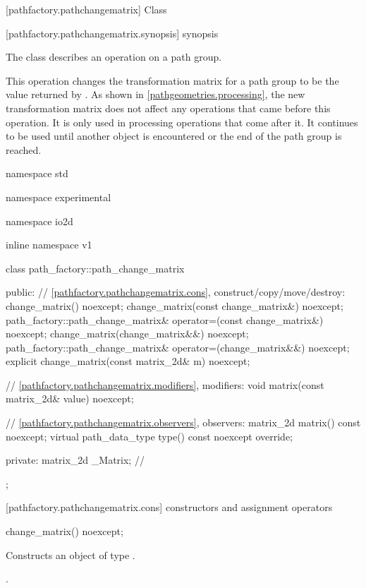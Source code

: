  [pathfactory.pathchangematrix] {Class }

 [pathfactory.pathchangematrix.synopsis] { synopsis}

\pnum
{}
The class  describes an operation on a path group.

\pnum
This operation changes the transformation matrix for a path group to be the value returned by . As shown in \ref{pathgeometries.processing}, the new transformation matrix does not affect any operations that came before this operation. It is only used in processing operations that come after it. It continues to be used until another  object is encountered or the end of the path group is reached.

\begin{codeblock}
namespace std { namespace experimental { namespace io2d { inline namespace v1 {
  class path_factory::path_change_matrix {
  public:
    // \ref{pathfactory.pathchangematrix.cons}, construct/copy/move/destroy:
    change_matrix() noexcept;
    change_matrix(const change_matrix&) noexcept;
    path_factory::path_change_matrix& operator=(const change_matrix&) noexcept;
    change_matrix(change_matrix&&) noexcept;
    path_factory::path_change_matrix& operator=(change_matrix&&) noexcept;
    explicit change_matrix(const matrix_2d& m) noexcept;

    // \ref{pathfactory.pathchangematrix.modifiers}, modifiers:
    void matrix(const matrix_2d& value) noexcept;

    // \ref{pathfactory.pathchangematrix.observers}, observers:
    matrix_2d matrix() const noexcept;
    virtual path_data_type type() const noexcept override;
    
  private:
    matrix_2d _Matrix; // \expos
  };
} } } }
\end{codeblock}

 [pathfactory.pathchangematrix.cons] { constructors and assignment operators}

\begin{itemdecl}
    change_matrix() noexcept;
\end{itemdecl}
\begin{itemdescr}
	\pnum
	\effects
	Constructs an object of type .
	
	\pnum
	\postconditions
	.
\end{itemdescr}

